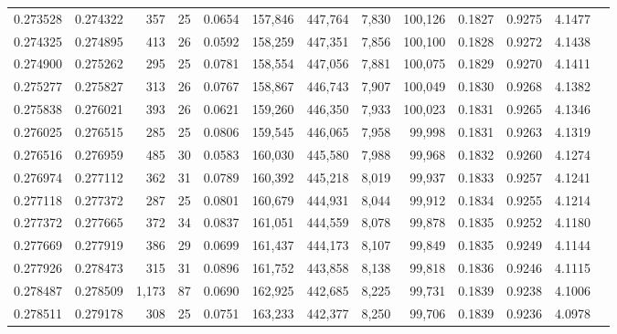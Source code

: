 \begin{tabular}{rrrrrrrrrrrrr}
0.273528 & 0.274322 &   357 &  25 &                                     0.0654 & 157,846 & 447,764 &   7,830 & 100,126 & 0.1827 & 0.9275 & 4.1477 \\
0.274325 & 0.274895 &   413 &  26 &                                     0.0592 & 158,259 & 447,351 &   7,856 & 100,100 & 0.1828 & 0.9272 & 4.1438 \\
0.274900 & 0.275262 &   295 &  25 &                                     0.0781 & 158,554 & 447,056 &   7,881 & 100,075 & 0.1829 & 0.9270 & 4.1411 \\
0.275277 & 0.275827 &   313 &  26 &                                     0.0767 & 158,867 & 446,743 &   7,907 & 100,049 & 0.1830 & 0.9268 & 4.1382 \\
0.275838 & 0.276021 &   393 &  26 &                                     0.0621 & 159,260 & 446,350 &   7,933 & 100,023 & 0.1831 & 0.9265 & 4.1346 \\
0.276025 & 0.276515 &   285 &  25 &                                     0.0806 & 159,545 & 446,065 &   7,958 &  99,998 & 0.1831 & 0.9263 & 4.1319 \\
0.276516 & 0.276959 &   485 &  30 &                                     0.0583 & 160,030 & 445,580 &   7,988 &  99,968 & 0.1832 & 0.9260 & 4.1274 \\
0.276974 & 0.277112 &   362 &  31 &                                     0.0789 & 160,392 & 445,218 &   8,019 &  99,937 & 0.1833 & 0.9257 & 4.1241 \\
0.277118 & 0.277372 &   287 &  25 &                                     0.0801 & 160,679 & 444,931 &   8,044 &  99,912 & 0.1834 & 0.9255 & 4.1214 \\
0.277372 & 0.277665 &   372 &  34 &                                     0.0837 & 161,051 & 444,559 &   8,078 &  99,878 & 0.1835 & 0.9252 & 4.1180 \\
0.277669 & 0.277919 &   386 &  29 &                                     0.0699 & 161,437 & 444,173 &   8,107 &  99,849 & 0.1835 & 0.9249 & 4.1144 \\
0.277926 & 0.278473 &   315 &  31 &                                     0.0896 & 161,752 & 443,858 &   8,138 &  99,818 & 0.1836 & 0.9246 & 4.1115 \\
0.278487 & 0.278509 & 1,173 &  87 &                                     0.0690 & 162,925 & 442,685 &   8,225 &  99,731 & 0.1839 & 0.9238 & 4.1006 \\
0.278511 & 0.279178 &   308 &  25 &                                     0.0751 & 163,233 & 442,377 &   8,250 &  99,706 & 0.1839 & 0.9236 & 4.0978 \\

\end{tabular}
